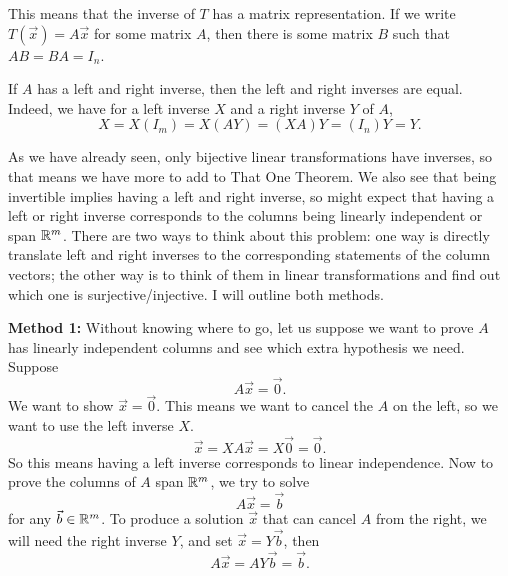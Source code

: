 This means that the inverse of $T$ has a matrix representation.
If we write $T(\vec{x})=A\vec{x}$ for some matrix $A$,
then there is some matrix $B$ such that $AB=BA=I_n$.
\begin{remark}
    If $A$ has a left and right inverse, then the left and right inverses are equal. Indeed, we have for a left inverse $X$ and a right inverse $Y$ of $A$,\[
    X= X(I_m)= X(AY) = (XA)Y = (I_n)Y = Y.
    \]
\end{remark}
As we have already seen, only bijective linear transformations have inverses, so that means we have more to add to That One Theorem. We also see that being invertible implies having a left and right inverse, so might expect that having a left or right inverse corresponds to the columns being linearly independent or span $\mathbb{R}^m$. 
There are two ways to think about this problem: one way is directly translate left and right inverses to the corresponding statements of the column vectors; the other way is to think of them in linear transformations and find out which one is surjective/injective. I will outline both methods.

\textbf{Method 1:} 
Without knowing where to go, let us suppose we want to prove $A$ has linearly independent columns and see which extra hypothesis we need. Suppose \[
    A\vec{x}=\vec{0}.
\]
We want to show $\vec{x} = \vec{0}$. This means we want to cancel the $A$ on the left, so we want to use the left inverse $X$. \[
\vec{x}=XA\vec{x} = X\vec{0} = \vec{0}.
\] 
So this means having a left inverse corresponds to linear independence.
Now to prove the columns of $A$ span $\mathbb{R}^m$, we try to solve \[
A\vec{x}=\vec{b}
\] for any $\vec{b}\in\mathbb{R}^m$.
To produce a solution $\vec{x}$ that can cancel $A$ from the right, we will need the right inverse $Y$, and set $\vec{x}=Y\vec{b}$, then
\[
A\vec{x}=AY\vec{b}=\vec{b}.
\]

